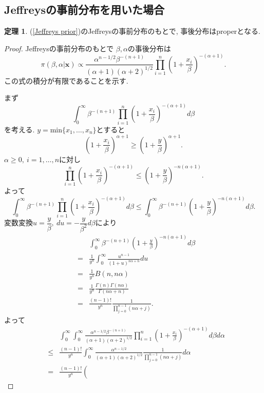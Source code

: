 \documentclass[titlepage,twoside]{jarticle}
\theoremstyle{definition}
\newtheorem{thm}{定理}
\begin{document}
\subsection{Jeffreysの事前分布を用いた場合}
\begin{thm}\label{thm1}
(\ref{Jeffreys prior})のJeffreysの事前分布のもとで, 事後分布はproperとなる.
\end{thm}
\begin{proof}
Jeffreysの事前分布のもとで $\beta ,\alpha $の事後分布は
$$
\pi(\beta ,\alpha |\bm{x})
\propto
\frac{\alpha^{n-1/2}\beta ^{-(n+1)}}{(\alpha +1)(\alpha +2)^{1/2}}
\prod_{i=1}^{n}
\left(1+\frac{x_{i}}{\beta }
\right)^{-(\alpha +1)}.
$$
この式の積分が有限であることを示す.

まず
$$
\int_{0}^{\infty}\beta ^{-(n+1)}\prod_{i=1}^{n}\left(1+\frac{x_{i}}{\beta }\right)
^{-(\alpha +1)}d\beta 
$$
を考える.
$y=\mbox{min}\{x_{1},\ldots,x_{n}\}$とすると
$$
\left(1+\frac{x_{i}}{\beta }\right)^{\alpha +1}
\geq
\left(1+\frac{y}{\beta }\right)^{\alpha +1}.
$$
$\alpha \geq 0,~i=1,\ldots,n$に対し
$$
\prod_{i=1}^{n}\left(1+\frac{x_{i}}{\beta }\right)^{-(\alpha +1)}
\leq
\left(1+\frac{y}{\beta }\right)^{-n(\alpha +1)}.
$$
よって
$$
\int_{0}^{\infty}\beta ^{-(n+1)}\prod_{i=1}^{n}
\left(1+\frac{x_{i}}{\beta }\right)^{-(\alpha +1)}d\beta 
\leq
\int_{0}^{\infty}\beta ^{-(n+1)}
\left(1+\frac{y}{\beta }\right)^{-n(\alpha +1)}d\beta .
$$
変数変換$u=\dfrac{y}{\beta },~du=-\dfrac{y}{\beta ^{2}}d\beta $により
\begin{eqnarray*}
&&
\int_{0}^{\infty}\beta ^{-(n+1)}
\left(1+\frac{y}{\beta }\right)^{-n(\alpha +1)}d\beta \\
&=&
\frac{1}{y^{n}}\int_{0}^{\infty}\frac{u^{n-1}}{(1+u)^{n\alpha +n}}du \\
&=&
\frac{1}{y^{n}}B(n,n\alpha) \\
&=&
\frac{1}{y^{n}}\frac{\Gamma (n)\Gamma(n\alpha )}{\Gamma (n\alpha +n)} \\
&=&
\frac{(n-1)!}{y^{n}}\frac{1}{\prod_{j=0}^{n-1}(n\alpha +j)}.
\end{eqnarray*}
よって
\begin{eqnarray*}
&&
\int_{0}^{\infty}\int_{0}^{\infty}
\frac{\alpha ^{n-1/2}\beta ^{-(n+1)}}{(\alpha +1)(\alpha +2)^{1/2}}
\prod_{i=1}^{n}\left(1+\frac{x_{i}}{\beta }\right)^{-(\alpha +1)}d\beta d\alpha \\
&\leq&
\frac{(n-1)!}{y^{n}}\int_{0}^{\infty}
\frac{\alpha ^{n-1/2}}{(\alpha +1)(\alpha +2)^{1/2}}
\frac{1}{\prod_{j=0}^{n-1}(n\alpha +j)}d\alpha \\
&=&
\frac{(n-1)!}{y^{n}}\left(

\end{eqnarray*}
\end{proof}
\end{document}
